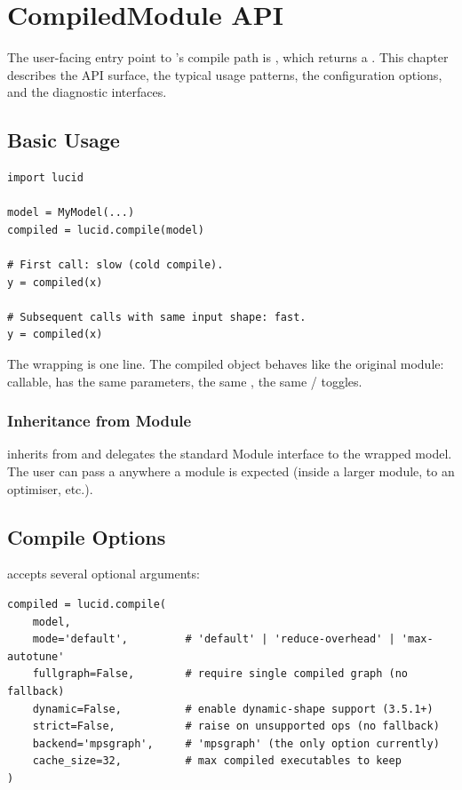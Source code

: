 \chapter{CompiledModule API}
\label{ch:compiled_module}

The user-facing entry point to \Lucid's compile path is
, which returns a
. This chapter describes the API surface,
the typical usage patterns, the configuration options, and the
diagnostic interfaces.

\section{Basic Usage}
\label{sec:compiled_module:basic_usage}

\begin{lstlisting}[style=lucid,language=LucidPython]
import lucid

model = MyModel(...)
compiled = lucid.compile(model)

# First call: slow (cold compile).
y = compiled(x)

# Subsequent calls with same input shape: fast.
y = compiled(x)
\end{lstlisting}

The wrapping is one line. The compiled object behaves like the
original module: callable, has the same parameters, the same
, the same  / 
toggles.

\subsection{Inheritance from Module}
\label{ssec:compiled_module:module_inheritance}

 inherits from  and
delegates the standard Module interface to the wrapped model.
The user can pass a  anywhere a module is
expected (inside a larger module, to an optimiser, etc.).

\section{Compile Options}
\label{sec:compiled_module:options}

 accepts several optional arguments:

\begin{lstlisting}[style=lucid,language=LucidPython]
compiled = lucid.compile(
    model,
    mode='default',         # 'default' | 'reduce-overhead' | 'max-autotune'
    fullgraph=False,        # require single compiled graph (no fallback)
    dynamic=False,          # enable dynamic-shape support (3.5.1+)
    strict=False,           # raise on unsupported ops (no fallback)
    backend='mpsgraph',     # 'mpsgraph' (the only option currently)
    cache_size=32,          # max compiled executables to keep
)
\end{lstlisting}

